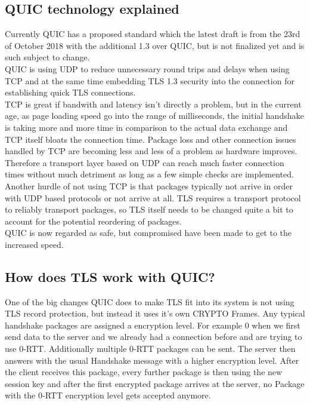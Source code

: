 \documentclass[a4paper,conference]{IEEEtran}
\begin{document}
\subsection{QUIC technology explained}
Currently QUIC has a proposed standard which the latest draft is from the 23rd of October 2018\cite{ietf-quic-transport-16} with the additional 1.3 over QUIC\cite{ietf-quic-tls-16}, but is not finalized yet and is such subject to change.\\
QUIC is using UDP to reduce unnecessary round trips and delays when using TCP and at the same time embedding TLS 1.3 security into the connection for establishing quick TLS connections.\\
TCP is great if bandwith and latency isn't directly a problem, but in the current age, as page loading speed go into the range of milliseconds, the initial handshake is taking more and more time in comparison to the actual data exchange and TCP itself bloats the connection time. Package loss and other connection issues handled by TCP are becoming less and less of a problem as hardware improves. Therefore a transport layer based on UDP can reach much faster connection times without much detriment as long as a few simple checks are implemented.
Another hurdle of not using TCP is that packages typically not arrive in order with UDP based protocols or not arrive at all. TLS requires a transport protocol to reliably transport packages, so TLS itself needs to be changed quite a bit to account for the potential reordering of packages.\\
QUIC is now regarded as safe, but compromised have been made to get to the increased speed.\cite{7163028} 
\subsection{How does TLS work with QUIC?}
One of the big changes QUIC does to make TLS fit into its system is not using TLS record protection, but instead it uses it's own CRYPTO Frames. Any typical handshake packages are assigned a encryption level. For example 0 when we first send data to the server and we already had a connection before and are trying to use 0-RTT. Additionally multiple 0-RTT packages can be sent. The server then answers with the usual Handshake message with a higher encryption level. After the client receives this package, every further package is then using the new session key and after the first encrypted package arrives at the server, no Package with the 0-RTT encryption level gets accepted anymore.
\end{document}
